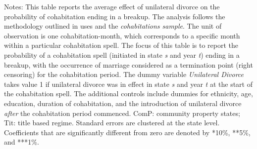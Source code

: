 \begin{table}[H]\centering                                  \scriptsize                                 \caption{The average effect of unilateral divorce on the probability that a cohabitation spell ends in a breakup by property regime at divorce. Unit of observation: cohabitation-month}                                   \label{tab:tabdurbcom}                                 
\begin{minipage}{\textwidth}
\scriptsize\smallskip
Notes: This table reports the average effect of unilateral divorce on the probability of cohabitation ending in a breakup. The analysis follows the methodology outlined in \cite{borusyak2021} uses and the \textit{cohabitations sample}. The unit of observation is one cohabitation-month, which corresponds to a specific month within a particular cohabitation spell. The focus of this table is to report the probability of a cohabitation spell (initiated in state \textit{s} and year \textit{t}) ending in a breakup, with the occurrence of marriage considered as a termination point (right censoring) for the cohabitation period. The dummy variable \textit{Unilateral Divorce} takes value 1 if unilateral divorce was in effect in state \textit{s} and year \textit{t} at the start of the cohabitation spell. The additional controls include dummies for ethnicity, age, education, duration of cohabitation,  and the introduction of unilateral divorce \textit{after} the cohabitation period commenced. ComP: community property states; Tit: title based regime. Standard errors are clustered at the state level. Coefficients that are significantly different from zero are denoted by *10\%, **5\%, and ***1\%.
\\
\end{minipage}
\end{table}
